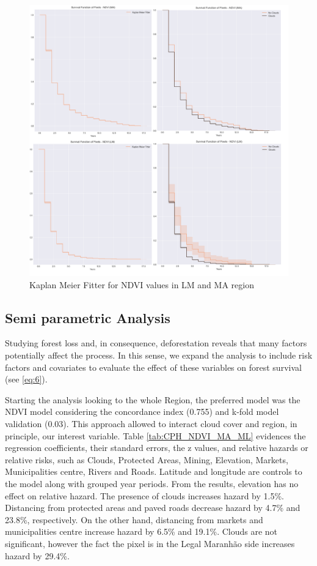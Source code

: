 \begin{figure}[H]
  \centering
  \includegraphics[width=1\textwidth]{KM_NDVI.png}
\caption{Kaplan Meier Fitter for NDVI values in LM and MA region}
\label{fig:km-ndvi}
\end{figure}


\subsection{Semi parametric Analysis} \label{resultssection2}

Studying forest loss and, in consequence, deforestation reveals that many factors potentially affect the process. In this sense, we expand the analysis to include risk factors and covariates to evaluate the effect of these variables on forest survival (see \ref{eq:6}). 

Starting the analysis looking to the whole Region, the preferred model was the NDVI model considering the concordance index (0.755) and k-fold model validation (0.03). This approach allowed to interact cloud cover and region, in principle, our interest variable. Table \ref{tab:CPH_NDVI_MA_ML} evidences the regression coefficients, their standard errors, the z values, and relative hazards or relative risks, such as Clouds, Protected Areas, Mining, Elevation, Markets, Municipalities centre, Rivers and Roads. Latitude and longitude are controls to the model along with grouped year periods. From the results, elevation has no effect on relative hazard. The presence of clouds increases hazard by 1.5\%. Distancing from protected areas and paved roads decrease hazard by 4.7\% and 23.8\%, respectively. On the other hand, distancing from markets and municipalities centre increase hazard by 6.5\% and 19.1\%. Clouds are not significant, however the fact the pixel is in the Legal Maranhão side increases hazard by 29.4\%. 

